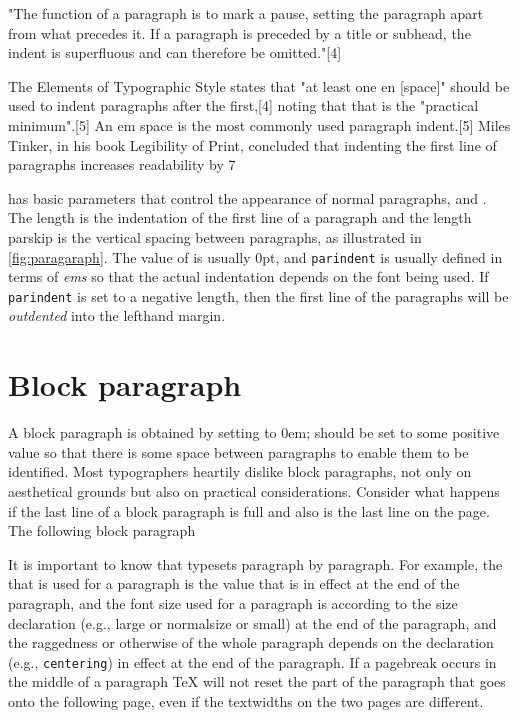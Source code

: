 "The function of a paragraph is to mark a pause, setting the paragraph apart from what precedes it. If a paragraph is preceded by a title or subhead, the indent is superfluous and can therefore be omitted."[4]

The Elements of Typographic Style states that "at least one en [space]" should be used to indent paragraphs after the first,[4] noting that that is the "practical minimum".[5] An em space is the most commonly used paragraph indent.[5] Miles Tinker, in his book Legibility of Print, concluded that indenting the first line of paragraphs increases readability by 7%

\begin{macro}{\parindent}
\begin{macro}{\parskip}
\begin{macro}{\noindent}
\LaTeXe has basic parameters that control the appearance of normal paragraphs,
 and  .
The length   is the indentation of the first line of a paragraph and the length
parskip is the vertical spacing between paragraphs, as illustrated in \ref{fig:paragaraph}. The
value of  is usually 0pt, and \texttt{parindent} is usually defined in terms of \textit{ems}
so that the actual indentation depends on the font being used. If \texttt{parindent} is set to a
negative length, then the first line of the paragraphs will be \textit{outdented} into the lefthand
margin.
\end{macro}
\end{macro}
\end{macro}



\section{Block paragraph}

A block paragraph is obtained by setting  to 0em;  should be set to
some positive value so that there is some space between paragraphs to enable them to be
identified. Most typographers heartily dislike block paragraphs, not only on aesthetical
grounds but also on practical considerations. Consider what happens if the last line of a
block paragraph is full and also is the last line on the page. The following block paragraph

It is important to know that \latex typesets paragraph by paragraph. For example, the
 that is used for a paragraph is the value that is in effect at the end of the
paragraph, and the font size used for a paragraph is according to the size declaration (e.g.,
large or normalsize or small) at the end of the paragraph, and the raggedness or
otherwise of the whole paragraph depends on the declaration (e.g., \texttt{centering}) in effect
at the end of the paragraph. If a pagebreak occurs in the middle of a paragraph TeX will
not reset the part of the paragraph that goes onto the following page, even if the textwidths
on the two pages are different.


